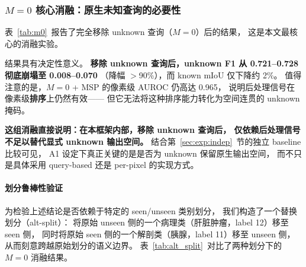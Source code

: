 \documentclass[3p,twocolumn,authoryear]{elsarticle}
\begin{document}
\subsubsection{$M=0$ 核心消融：原生未知查询的必要性}\label{sec:exp:ablation:m0}

表~\ref{tab:m0}~报告了完全移除 unknown 查询（$M=0$）后的结果，
这是本文最核心的消融实验。

\begin{table}[t]
\centering
\footnotesize
\setlength{\tabcolsep}{3pt}
\caption{$M=0$ 消融：移除原生未知查询后，后处理信号能否替代结构化弃权？
Synapse A1 协议。表中的 \texttt{---} 表示该指标在该设定下不适用或未报告。}\label{tab:m0}
\end{table}

结果具有决定性意义。
\textbf{移除 unknown 查询后，unknown F1 从 0.721--0.728 彻底崩塌至 0.008--0.070}
（降幅 $>$90\%），而 known mIoU 仅下降约 2\%。
值得注意的是，$M=0$ + MSP 的像素级 AUROC 仍高达 0.965，
说明后处理信号在像素级\textbf{排序}上仍然有效——
但它无法将这种排序能力转化为空间连贯的 unknown 掩码。

\textbf{这组消融直接说明：在本框架内部，移除 unknown 查询后，
仅依赖后处理信号不足以替代显式 unknown 输出空间。}
结合第~\ref{sec:exp:indep}~节的独立 baseline 比较可见，
A1 设定下真正关键的是是否为 unknown 保留原生输出空间，
而不只是具体采用 query-based 还是 per-pixel 的实现方式。

\paragraph{划分鲁棒性验证}
为检验上述结论是否依赖于特定的 seen/unseen 类别划分，
我们构造了一个替换划分（alt-split）：
将原始 unseen 侧的一个病理类（肝脏肿瘤，label 12）移至 seen 侧，
同时将原始 seen 侧的一个解剖类（胰腺，label 11）移至 unseen 侧，
从而刻意跨越原始划分的语义边界。
表~\ref{tab:alt_split}~对比了两种划分下的 $M=0$ 消融结果。
\end{document}
